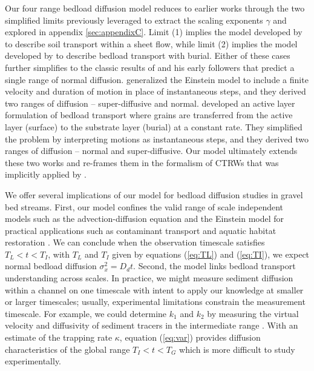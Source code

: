 \documentclass[draft,grl]{agujournal2018}
\begin{document}
Our four range bedload diffusion model reduces to earlier works through the two simplified limits previously leveraged to extract the scaling exponents $\gamma$ and explored in appendix \ref{sec:appendixC}.
Limit (1) implies the model developed by \citet{Lisle1998} to describe soil transport within a sheet flow, while limit (2) implies the model developed by \citet{Wu2019} to describe bedload transport with burial.
Either of these cases further simplifies to the classic results of \citet{Einstein1937} and his early followers \citep[e.g.,][]{Hubbell1964, Nakagawa1976, Yano1969} that predict a single range of normal diffusion.
\citet{Lisle1998} generalized the Einstein model to include a finite velocity and duration of motion in place of instantaneous steps, and they derived two ranges of diffusion -- super-diffusive and normal.
\citet{Wu2019} developed an active layer formulation of bedload transport where grains are transferred from the active layer (surface) to the substrate layer (burial) at a constant rate.
They simplified the problem by interpreting motions as instantaneous steps, and they derived two ranges of diffusion -- normal and super-diffusive.
Our model ultimately extends these two works and re-frames them in the formalism of CTRWs \citep[e.g.,][]{Weiss1994} that was implicitly applied by \citet{Einstein1937}.

We offer several implications of our model for bedload diffusion studies in gravel bed streams.
First, our model confines the valid range of scale independent models such as the advection-diffusion equation \citep[e.g.,][]{Bradley2010} and the Einstein model \citep[e.g.,][]{Martin2012} for practical applications such as contaminant transport \citep[e.g][]{Malmon2005,Macklin2006} and aquatic habitat restoration \citep[e.g.,][]{Gaeuman2017}.
We can conclude when the observation timescale satisfies $T_L<t<T_I$, with $T_L$ and $T_I$ given by equations (\ref{eq:TL}) and (\ref{eq:TI}), we expect normal bedload diffusion $\sigma_x^2 = D_d t$.
Second, the model links bedload transport understanding across scales. 
In practice, we might measure sediment diffusion within a channel on one timescale with intent to apply our knowledge at smaller or larger timescales; usually, experimental limitations constrain the measurement timescale.
For example, we could determine $k_1$ and $k_2$ by measuring the virtual velocity and diffusivity of sediment tracers in the intermediate range \citep[e.g.,][]{Einstein1937,Yano1969a,Nakagawa1976}.
With an estimate of the trapping rate $\kappa$, equation (\ref{eq:var}) provides diffusion characteristics of the global range $T_I<t<T_G$ which is more difficult to study experimentally.
\end{document}
